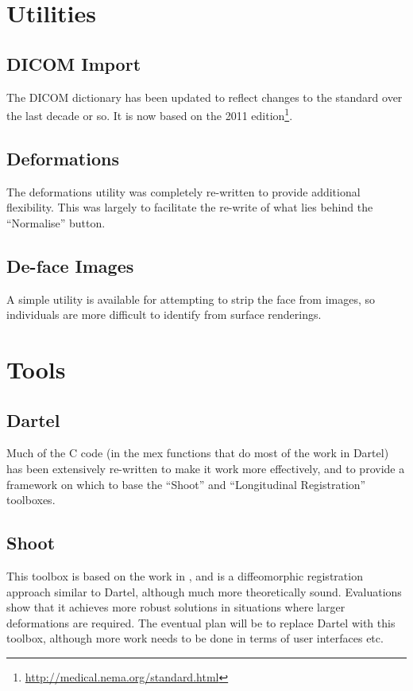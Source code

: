 \documentclass[a4paper,titlepage,openany]{article}
\begin{document}
\section{Utilities}

\subsection{DICOM Import}
The DICOM dictionary has been updated to reflect changes to the standard over the last decade or so.
It is now based on the 2011 edition\footnote{\url{http://medical.nema.org/standard.html}}.

\subsection{Deformations}
The deformations utility was completely re-written to provide additional flexibility.
This was largely to facilitate the re-write of what lies behind the ``Normalise'' button.

\subsection{De-face Images}
A simple utility is available for attempting to strip the face from images, so individuals are more difficult to identify from surface renderings.

\section{Tools}

\subsection{Dartel}
Much of the C code (in the mex functions that do most of the work in Dartel) has been extensively re-written to make it work more effectively, and to provide a framework on which to base the ``Shoot'' and ``Longitudinal Registration'' toolboxes.

\subsection{Shoot}
This toolbox is based on the work in \cite{ashburner2011diffeomorphic}, and is a diffeomorphic registration approach similar to Dartel, although much more theoretically sound.
Evaluations show that it achieves more robust solutions in situations where larger deformations are required.
The eventual plan will be to replace Dartel with this toolbox, although more work needs to be done in terms of user interfaces etc.
\end{document}
